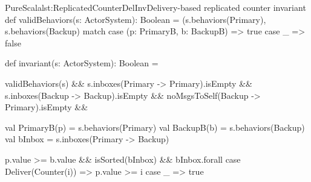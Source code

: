 \documentclass[a4paper,twoside]{article}
\begin{document}
\begin{Code}{PureScala}{lst:ReplicatedCounterDelInv}{Delivery-based replicated counter invariant}
def validBehaviors(s: ActorSystem): Boolean = {
  (s.behaviors(Primary), s.behaviors(Backup) match {
    case (p: PrimaryB, b: BackupB) => true
    case _                         => false
  }
}

def invariant(s: ActorSystem): Boolean = {
  validBehaviors(s)                       &&
  s.inboxes(Primary -> Primary).isEmpty   &&
  s.inboxes(Backup -> Backup).isEmpty     &&
  noMsgsToSelf(Backup -> Primary).isEmpty &&
  {
    val PrimaryB(p) = s.behaviors(Primary)
    val BackupB(b)  = s.behaviors(Backup)
    val bInbox      = s.inboxes(Primary -> Backup)

    p.value >= b.value && isSorted(bInbox) && bInbox.forall {
      case Deliver(Counter(i)) => p.value >= i
      case _                   => true
    }
  }
}
\end{Code}
\end{document}
